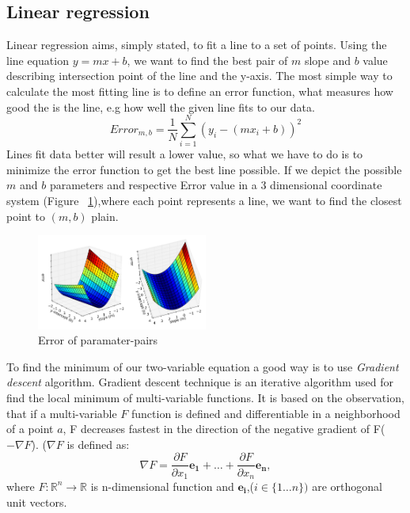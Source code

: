 \subsection{Linear regression} \label{linearregression}
Linear regression aims, simply stated, to fit a line to a set of points. Using the line equation $y=mx+b$, we want to find the best pair of $m$ slope and $b$ value describing intersection point of the line and the y-axis. The most simple way  to calculate the most fitting line is to define an error function, what measures how good the is the line, e.g how well the given line fits to our data.
\begin{equation}
Error_{m,b}= \dfrac{1}{N} \sum_{i=1}^{N}(y_i-(mx_i+b))^{2}
\end{equation}
Lines fit data better will result a lower value, so what we have to do is to minimize the error function to get the best line possible. If we depict the possible $m$ and $b$ parameters and respective Error value in a 3 dimensional coordinate system (Figure ~\ref{fig:gradient_descent_error_surface}),where each point represents a line, we want to find the closest point to $(m,b)$ plain. 
\begin{figure}[!ht]
  \centering    
      \includegraphics[width=0.5\textwidth]{figures/gradient_descent_error_surface.png}
  \caption{Error of paramater-pairs\cite{gradientdescent}}
  \label{fig:gradient_descent_error_surface}
\end{figure}

To find the minimum of our two-variable equation a good way is to use \textit{Gradient descent}\cite{wikigraddesc} algorithm. Gradient descent technique is an iterative algorithm used for find the local minimum of multi-variable functions. It is based on the observation, that if a multi-variable $F$ function is defined and differentiable in a neighborhood of a point $a$, F decreases fastest in the direction of the negative gradient of F($-\nabla F$). ($\nabla F$ is defined as: 
\begin{equation}
\nabla F= \dfrac{\partial F}{\partial x_1}\boldsymbol{e_1}+\dots+\dfrac{\partial F}{\partial x_n}\boldsymbol{e_n},
\end{equation} 
where $F:\mathbb{R}^{n}\to 	\mathbb{R}$ is n-dimensional function and $\boldsymbol{e_i}$,($i\in\{1\dots n\})$ are orthogonal unit vectors.

